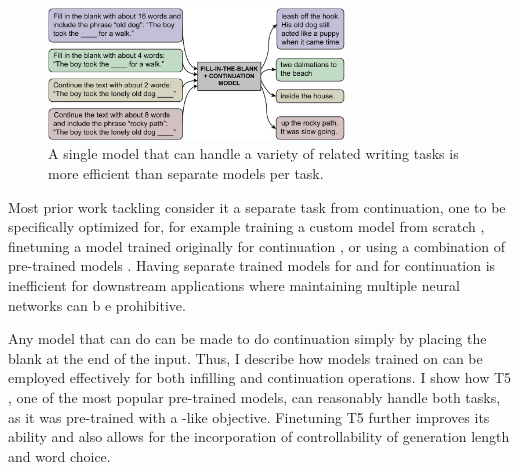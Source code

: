 \begin{figure}[t]
    \centering
    \includegraphics[width=0.7\textwidth]{figures/leading_figure.pdf}
    \caption{A single model that can handle a variety of related writing tasks is more efficient than separate models per task.}
    \label{fig:leading_figure}
\end{figure}

Most prior work tackling \FitB{} consider it a separate task from continuation, one to be specifically optimized for, for example training a custom model from scratch \citep{ippolito2019unsupervised,zhu2019text,mori2020finding}, finetuning a model trained originally for continuation \citep{donahue2020enabling}, or using a combination of pre-trained models \citep{huang2020inset}.
Having separate trained models for \FitB{} and for continuation is inefficient for downstream applications where maintaining multiple neural networks can b e prohibitive.

Any model that can do \FitB{} can be made to do continuation simply by placing the blank at the end of the input.
Thus, I describe how models trained on \FitB{} can be employed effectively for both infilling and continuation operations.
I show how T5 \citep{raffel2019exploring}, one of the most popular pre-trained models, can reasonably handle both tasks, as it was pre-trained with a \FitB-like objective.
Finetuning T5 further improves its ability and also allows for the incorporation of controllability of generation length and word choice.



